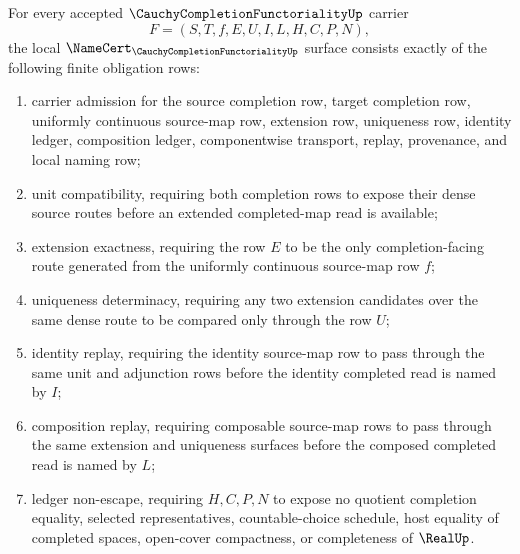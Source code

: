 \begin{theorem}
\label{thm:cauchy-completion-functoriality-namecert-obligations}
For every accepted $\CauchyCompletionFunctorialityUp$ carrier
$$
F=(S,T,f,E,U,I,L,H,C,P,N),
$$
the local $\NameCert_{\CauchyCompletionFunctorialityUp}$ surface consists exactly of the following finite obligation rows:
\begin{enumerate}
\item carrier admission for the source completion row, target completion row, uniformly continuous source-map row, extension row, uniqueness row, identity ledger, composition ledger, componentwise transport, replay, provenance, and local naming row;
\item unit compatibility, requiring both completion rows to expose their dense source routes before an extended completed-map read is available;
\item extension exactness, requiring the row $E$ to be the only completion-facing route generated from the uniformly continuous source-map row $f$;
\item uniqueness determinacy, requiring any two extension candidates over the same dense route to be compared only through the row $U$;
\item identity replay, requiring the identity source-map row to pass through the same unit and adjunction rows before the identity completed read is named by $I$;
\item composition replay, requiring composable source-map rows to pass through the same extension and uniqueness surfaces before the composed completed read is named by $L$;
\item ledger non-escape, requiring $H,C,P,N$ to expose no quotient completion equality, selected representatives, countable-choice schedule, host equality of completed spaces, open-cover compactness, or completeness of $\RealUp$.
\end{enumerate}
\end{theorem}
